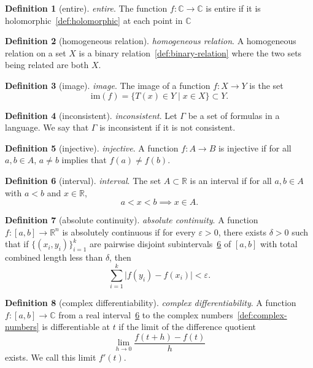 \documentclass[12pt,a4paper]{article}
\theoremstyle{definition}
\newtheorem{definition}{Definition}
\begin{document}
\begin{definition}[entire]\label{def:entire}
\emph{entire}. The function $f:\mathbb C\to \mathbb C$ is entire if it is holomorphic~\ref{def:holomorphic} at each point in $\mathbb C$
\end{definition}

\begin{definition}[homogeneous relation]\label{def:homogeneous-relation}
\emph{homogeneous relation}. A homogeneous relation on a set $X$ is a binary relation~\ref{def:binary-relation} where the two sets being related are both $X$.
\end{definition}

\begin{definition}[image]\label{def:image}
\emph{image}. The image of a function $f:X\to Y$ is the set $$\text{im}(f) = \{T(x) \in Y \mid x \in X\}\subset Y.$$
\end{definition}

\begin{definition}[inconsistent]\label{def:inconsistent}
\emph{inconsistent}. Let $\Gamma$ be a set of formulas in a language. We say that $\Gamma$ is inconsistent if it is not consistent.
\end{definition}

\begin{definition}[injective]\label{def:injective}
\emph{injective}. A function $f:A\to B$ is injective if for all $a,b \in A$, $a\neq b$ implies that $f(a)\neq f(b)$.
\end{definition}

\begin{definition}[interval]\label{def:interval}
\emph{interval}. The set $A\subset \mathbb R$ is an interval if for all $a,b \in A$ with $a<b$ and $x\in \mathbb R$, $$a<x<b \implies x\in A.$$
\end{definition}

\begin{definition}[absolute continuity]\label{def:absolute-continuity}
\emph{absolute continuity}. A function $f:[a,b]\to \mathbb R^n$ is absolutely continuous if for every $\varepsilon > 0$, there exists $\delta > 0$ such that if $\{(x_i,y_i)\}_{i=1}^k$ are pairwise disjoint subintervals~\ref{def:interval} of $[a,b]$ with total combined length less than $\delta$, then $$\sum_{i=1}^k \vert f(y_i) - f(x_i)\vert  < \varepsilon.$$
\end{definition}

\begin{definition}[complex differentiability]\label{def:complex-differentiability}
\emph{complex differentiability}. A function $f: [a,b] \to \mathbb C$ from a real interval~\ref{def:interval} to the complex numbers~\ref{def:complex-numbers} is differentiable at $t$ if the limit of the difference quotient $$\lim_{h\to 0}\frac{f(t+h) - f(t)}{h}$$ exists. We call this limit $f'(t)$.
\end{definition}
\end{document}
